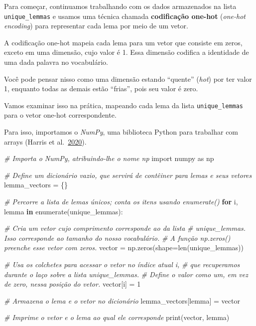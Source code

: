 \documentclass[
  brazilian,
]{article}
\newenvironment{Shaded}{}{}
\newcommand{\BuiltInTok}[1]{#1}
\newcommand{\CommentTok}[1]{\textcolor[rgb]{0.38,0.63,0.69}{\textit{#1}}}
\newcommand{\ControlFlowTok}[1]{\textcolor[rgb]{0.00,0.44,0.13}{\textbf{#1}}}
\newcommand{\DecValTok}[1]{\textcolor[rgb]{0.25,0.63,0.44}{#1}}
\newcommand{\ImportTok}[1]{#1}
\newcommand{\KeywordTok}[1]{\textcolor[rgb]{0.00,0.44,0.13}{\textbf{#1}}}
\newcommand{\NormalTok}[1]{#1}
\newcommand{\OperatorTok}[1]{\textcolor[rgb]{0.40,0.40,0.40}{#1}}
\begin{document}
Para começar, continuamos trabalhando com os dados armazenados na lista
\texttt{unique\_lemmas} e usamos uma técnica chamada \textbf{codificação
one-hot} (\emph{one-hot encoding}) para representar cada lema por meio
de um vetor.

A codificação one-hot mapeia cada lema para um vetor que consiste em
zeros, exceto em uma dimensão, cujo valor é 1. Essa dimensão codifica a
identidade de uma dada palavra no vocabulário.

Você pode pensar nisso como uma dimensão estando ``quente'' (\emph{hot})
por ter valor 1, enquanto todas as demais estão ``frias'', pois seu
valor é zero.

Vamos examinar isso na prática, mapeando cada lema da lista
\texttt{unique\_lemmas} para o vetor one-hot correspondente.

Para isso, importamos o \emph{NumPy}, uma biblioteca Python para
trabalhar com arrays (Harris et
al.~\href{https://doi.org/10.1038/s41586-020-2649-2}{2020}).

\begin{Shaded}
\begin{Highlighting}[]
\CommentTok{\# Importa o NumPy, atribuindo{-}lhe o nome \textquotesingle{}np\textquotesingle{}}
\ImportTok{import}\NormalTok{ numpy }\ImportTok{as}\NormalTok{ np}

\CommentTok{\# Define um dicionário vazio, que servirá de contêiner para lemas e seus vetores}
\NormalTok{lemma\_vectors }\OperatorTok{=}\NormalTok{ \{\}}

\CommentTok{\# Percorre a lista de lemas únicos; conta os itens usando enumerate()}
\ControlFlowTok{for}\NormalTok{ i, lemma }\KeywordTok{in} \BuiltInTok{enumerate}\NormalTok{(unique\_lemmas):}

    \CommentTok{\# Cria um vetor cujo comprimento corresponde ao da lista}
    \CommentTok{\# \textquotesingle{}unique\_lemmas\textquotesingle{}. Isso corresponde ao tamanho do nosso vocabulário.}
    \CommentTok{\# A função np.zeros() preenche esse vetor com zeros.}
\NormalTok{    vector }\OperatorTok{=}\NormalTok{ np.zeros(shape}\OperatorTok{=}\BuiltInTok{len}\NormalTok{(unique\_lemmas))}

    \CommentTok{\# Usa os colchetes para acessar o vetor no índice atual \textquotesingle{}i\textquotesingle{},}
    \CommentTok{\# que recuperamos durante o laço sobre a lista \textquotesingle{}unique\_lemmas\textquotesingle{}.}
    \CommentTok{\# Define o valor como um, em vez de zero, nessa posição do vetor.}
\NormalTok{    vector[i] }\OperatorTok{=} \DecValTok{1}

    \CommentTok{\# Armazena o lema e o vetor no dicionário}
\NormalTok{    lemma\_vectors[lemma] }\OperatorTok{=}\NormalTok{ vector}

    \CommentTok{\# Imprime o vetor e o lema ao qual ele corresponde}
    \BuiltInTok{print}\NormalTok{(vector, lemma)}
\end{Highlighting}
\end{Shaded}
\end{document}
